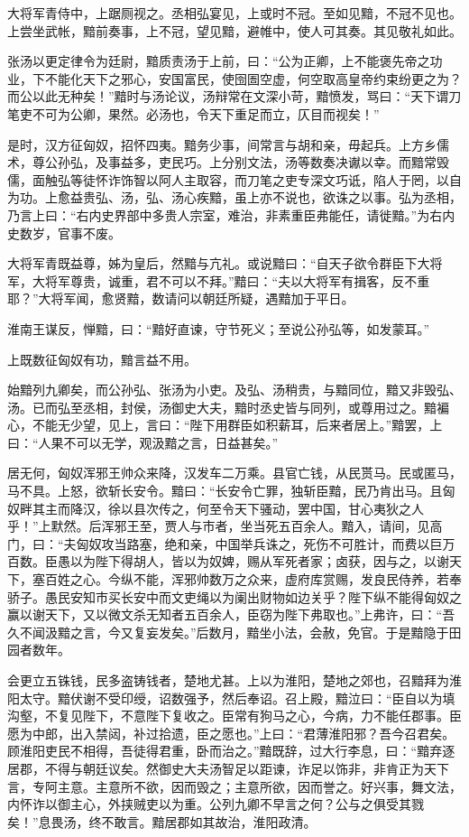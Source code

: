 \documentclass[]{article}
\begin{document}
大将军青侍中，上踞厕视之。丞相弘宴见，上或时不冠。至如见黯，不冠不见也。上尝坐武帐，黯前奏事，上不冠，望见黯，避帷中，使人可其奏。其见敬礼如此。

张汤以更定律令为廷尉，黯质责汤于上前，曰：``公为正卿，上不能褒先帝之功业，下不能化天下之邪心，安国富民，使囹圄空虚，何空取高皇帝约束纷更之为？而公以此无种矣！''黯时与汤论议，汤辩常在文深小苛，黯愤发，骂曰：``天下谓刀笔吏不可为公卿，果然。必汤也，令天下重足而立，仄目而视矣！''

是时，汉方征匈奴，招怀四夷。黯务少事，间常言与胡和亲，毋起兵。上方乡儒术，尊公孙弘，及事益多，吏民巧。上分别文法，汤等数奏决谳以幸。而黯常毁儒，面触弘等徒怀诈饰智以阿人主取容，而刀笔之吏专深文巧诋，陷人于罔，以自为功。上愈益贵弘、汤，弘、汤心疾黯，虽上亦不说也，欲诛之以事。弘为丞相，乃言上曰：``右内史界部中多贵人宗室，难治，非素重臣弗能任，请徙黯。''为右内史数岁，官事不废。

大将军青既益尊，姊为皇后，然黯与亢礼。或说黯曰：``自天子欲令群臣下大将军，大将军尊贵，诚重，君不可以不拜。''黯曰：``夫以大将军有揖客，反不重耶？''大将军闻，愈贤黯，数请问以朝廷所疑，遇黯加于平日。

淮南王谋反，惮黯，曰：``黯好直谏，守节死义；至说公孙弘等，如发蒙耳。''

上既数征匈奴有功，黯言益不用。

始黯列九卿矣，而公孙弘、张汤为小吏。及弘、汤稍贵，与黯同位，黯又非毁弘、汤。已而弘至丞相，封侯，汤御史大夫，黯时丞史皆与同列，或尊用过之。黯褊心，不能无少望，见上，言曰：``陛下用群臣如积薪耳，后来者居上。''黯罢，上曰：``人果不可以无学，观汲黯之言，日益甚矣。''

居无何，匈奴浑邪王帅众来降，汉发车二万乘。县官亡钱，从民贳马。民或匿马，马不具。上怒，欲斩长安令。黯曰：``长安令亡罪，独斩臣黯，民乃肯出马。且匈奴畔其主而降汉，徐以县次传之，何至令天下骚动，罢中国，甘心夷狄之人乎！''上默然。后浑邪王至，贾人与市者，坐当死五百余人。黯入，请间，见高门，曰：``夫匈奴攻当路塞，绝和亲，中国举兵诛之，死伤不可胜计，而费以巨万百数。臣愚以为陛下得胡人，皆以为奴婢，赐从军死者家；卤获，因与之，以谢天下，塞百姓之心。今纵不能，浑邪帅数万之众来，虚府库赏赐，发良民侍养，若奉骄子。愚民安知市买长安中而文吏绳以为阑出财物如边关乎？陛下纵不能得匈奴之赢以谢天下，又以微文杀无知者五百余人，臣窃为陛下弗取也。''上弗许，曰：``吾久不闻汲黯之言，今又复妄发矣。''后数月，黯坐小法，会赦，免官。于是黯隐于田园者数年。

会更立五铢钱，民多盗铸钱者，楚地尤甚。上以为淮阳，楚地之郊也，召黯拜为淮阳太守。黯伏谢不受印绶，诏数强予，然后奉诏。召上殿，黯泣曰：``臣自以为填沟壑，不复见陛下，不意陛下复收之。臣常有狗马之心，今病，力不能任郡事。臣愿为中郎，出入禁闼，补过拾遗，臣之愿也。''上曰：``君薄淮阳邪？吾今召君矣。顾淮阳吏民不相得，吾徒得君重，卧而治之。''黯既辞，过大行李息，曰：``黯弃逐居郡，不得与朝廷议矣。然御史大夫汤智足以距谏，诈足以饰非，非肯正为天下言，专阿主意。主意所不欲，因而毁之；主意所欲，因而誉之。好兴事，舞文法，内怀诈以御主心，外挟贼吏以为重。公列九卿不早言之何？公与之俱受其戮矣！''息畏汤，终不敢言。黯居郡如其故治，淮阳政清。
\end{document}
